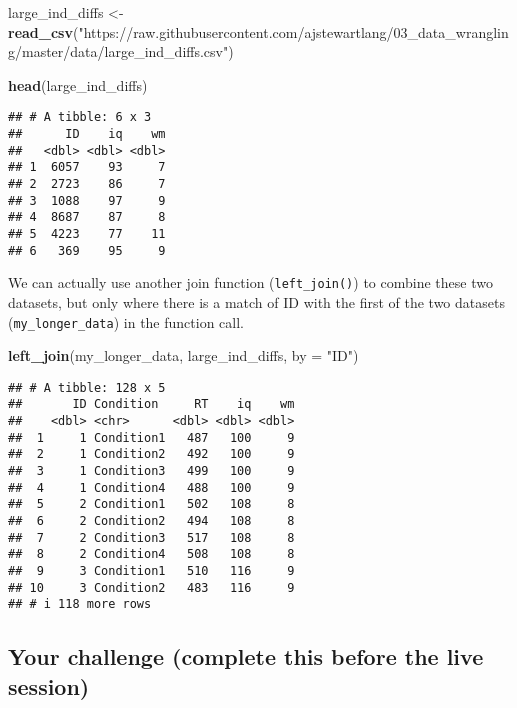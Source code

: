\documentclass[
]{book}
\newenvironment{Shaded}{\begin{snugshade}}{\end{snugshade}}
\newcommand{\AttributeTok}[1]{\textcolor[rgb]{0.13,0.29,0.53}{#1}}
\newcommand{\FunctionTok}[1]{\textcolor[rgb]{0.13,0.29,0.53}{\textbf{#1}}}
\newcommand{\NormalTok}[1]{#1}
\newcommand{\OtherTok}[1]{\textcolor[rgb]{0.56,0.35,0.01}{#1}}
\newcommand{\StringTok}[1]{\textcolor[rgb]{0.31,0.60,0.02}{#1}}
\begin{document}
\begin{Shaded}
\begin{Highlighting}[]
\NormalTok{large\_ind\_diffs }\OtherTok{\textless{}{-}} \FunctionTok{read\_csv}\NormalTok{(}\StringTok{"https://raw.githubusercontent.com/ajstewartlang/03\_data\_wrangling/master/data/large\_ind\_diffs.csv"}\NormalTok{)}
\end{Highlighting}
\end{Shaded}

\begin{Shaded}
\begin{Highlighting}[]
\FunctionTok{head}\NormalTok{(large\_ind\_diffs)}
\end{Highlighting}
\end{Shaded}

\begin{verbatim}
## # A tibble: 6 x 3
##      ID    iq    wm
##   <dbl> <dbl> <dbl>
## 1  6057    93     7
## 2  2723    86     7
## 3  1088    97     9
## 4  8687    87     8
## 5  4223    77    11
## 6   369    95     9
\end{verbatim}

We can actually use another join function (\texttt{left\_join()}) to combine these two datasets, but only where there is a match of ID with the first of the two datasets (\texttt{my\_longer\_data}) in the function call.

\begin{Shaded}
\begin{Highlighting}[]
\FunctionTok{left\_join}\NormalTok{(my\_longer\_data, large\_ind\_diffs, }\AttributeTok{by =} \StringTok{"ID"}\NormalTok{)}
\end{Highlighting}
\end{Shaded}

\begin{verbatim}
## # A tibble: 128 x 5
##       ID Condition     RT    iq    wm
##    <dbl> <chr>      <dbl> <dbl> <dbl>
##  1     1 Condition1   487   100     9
##  2     1 Condition2   492   100     9
##  3     1 Condition3   499   100     9
##  4     1 Condition4   488   100     9
##  5     2 Condition1   502   108     8
##  6     2 Condition2   494   108     8
##  7     2 Condition3   517   108     8
##  8     2 Condition4   508   108     8
##  9     3 Condition1   510   116     9
## 10     3 Condition2   483   116     9
## # i 118 more rows
\end{verbatim}

\hypertarget{your-challenge-complete-this-before-the-live-session}{%
\subsection{Your challenge (complete this before the live session)}\label{your-challenge-complete-this-before-the-live-session}}
\end{document}
